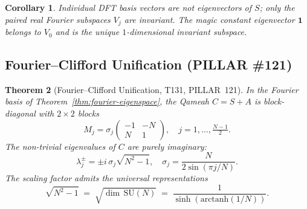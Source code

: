\documentclass[aps,prd,twocolumn,superscriptaddress,floatfix,nofootinbib]{revtex4-2}
\newtheorem{theorem}{Theorem}
\newtheorem{corollary}[theorem]{Corollary}
\theoremstyle{definition}
\theoremstyle{remark}
\begin{document}
\begin{corollary}
  Individual DFT basis vectors are \emph{not} eigenvectors of $S$; only the
  paired real Fourier subspaces $V_j$ are invariant.  The magic constant
  eigenvector $\mathbf{1}$ belongs to $V_0$ and is the unique $1$-dimensional
  invariant subspace.
\end{corollary}

\subsection{Fourier--Clifford Unification (PILLAR \#121)}
\label{sec:fourier-clifford}

\begin{theorem}[Fourier--Clifford Unification, T131, PILLAR~121]
\label{thm:fourier-clifford}
  In the Fourier basis of Theorem~\ref{thm:fourier-eigenspace}, the Qameah
  $C = S+A$ is block-diagonal with $2\times 2$ blocks
  \[
    M_j = \sigma_j
    \begin{pmatrix} -1 & -N \\ N & 1 \end{pmatrix},
    \quad j = 1,\ldots,\tfrac{N-1}{2}.
  \]
  The non-trivial eigenvalues of $C$ are purely imaginary:
  \[
    \lambda_j^{\pm} = \pm i\,\sigma_j\sqrt{N^2-1},
    \quad \sigma_j = \frac{N}{2\sin(\pi j/N)}.
  \]
  The scaling factor admits the universal representations
  \[
    \sqrt{N^2-1}
      \;=\; \sqrt{\dim\,\mathrm{SU}(N)}
      \;=\; \frac{1}{\sinh(\mathrm{arctanh}(1/N))}.
  \]
\end{theorem}
\end{document}
